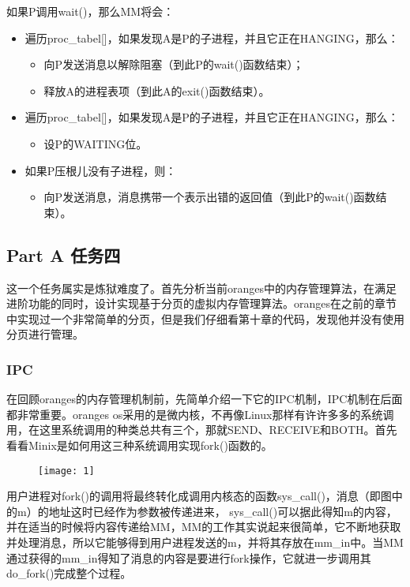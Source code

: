 \documentclass{whureport}
\begin{document}
如果P调用wait()，那么MM将会：

\begin{itemize}
  \item 遍历proc\_tabel[]，如果发现A是P的子进程，并且它正在HANGING，那么：
  \begin{itemize}
  \item 向P发送消息以解除阻塞（到此P的wait()函数结束）；
  \item 释放A的进程表项（到此A的exit()函数结束）。
\end{itemize}

  \item 遍历proc\_tabel[]，如果发现A是P的子进程，并且它正在HANGING，那么：
  \begin{itemize}
  \item 设P的WAITING位。
\end{itemize}

  \item 如果P压根儿没有子进程，则：
  \begin{itemize}
  \item 向P发送消息，消息携带一个表示出错的返回值（到此P的wait()函数结束）。
\end{itemize}

\end{itemize}


\subsection{Part A 任务四}
这一个任务属实是炼狱难度了。首先分析当前oranges中的内存管理算法，在满足进阶功能的同时，设计实现基于分页的虚拟内存管理算法。oranges在之前的章节中实现过一个非常简单的分页，但是我们仔细看第十章的代码，发现他并没有使用分页进行管理。

\subsubsection{IPC}
在回顾oranges的内存管理机制前，先简单介绍一下它的IPC机制，IPC机制在后面都非常重要。oranges os采用的是微内核，不再像Linux那样有许许多多的系统调用，在这里系统调用的种类总共有三个，那就SEND、RECEIVE和BOTH。首先看看Minix是如何用这三种系统调用实现fork()函数的。

\begin{figure}[H]
\centering
\texttt{[image: 1]}
\end{figure}


用户进程对fork()的调用将最终转化成调用内核态的函数sys\_call()，消息（即图中的m）的地址这时已经作为参数被传递进来， sys\_call()可以据此得知m的内容，并在适当的时候将内容传递给MM，MM的工作其实说起来很简单，它不断地获取并处理消息，所以它能够得到用户进程发送的m，并将其存放在mm\_in中。当MM通过获得的mm\_in得知了消息的内容是要进行fork操作，它就进一步调用其do\_fork()完成整个过程。
\end{document}
